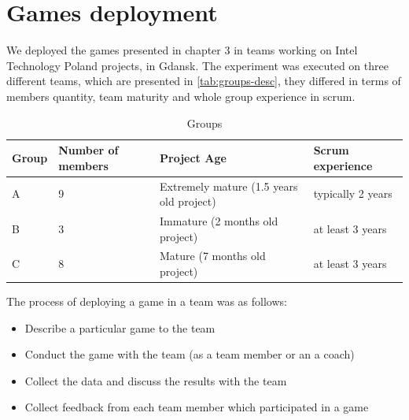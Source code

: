 \chapter{Games deployment}
We deployed the games presented in chapter 3 in teams working on Intel Technology Poland projects, in Gdansk. The experiment was executed on three different teams, which are presented in \autoref{tab:groups-desc}, they differed in terms of members quantity, team maturity and whole group experience in scrum. 


\begin{table}[!htbp]
	\caption{Groups}
	\label{tab:groups-desc}
	\begin{tabularx}{\textwidth}{|X|X|X|X|}
	\hline
		Group & Number of members & Project Age & Scrum experience \\ \hline
		A & 9 & Extremely mature (1.5 years old project) & typically 2 years  \\ \hline
		B & 3 & Immature (2 months old project) & at least 3 years  \\ \hline
		C & 8 & Mature (7 months old project) & at least 3 years \\ \hline
	\end{tabularx}
\end{table}

The process of deploying a game in a team was as follows:
\begin{itemize}
    \item Describe a particular game to the team
    \item Conduct the game with the team (as a team member or an a coach)
    \item Collect the data and discuss the results with the team
    \item Collect feedback from each team member which participated in a game
\end{itemize}

